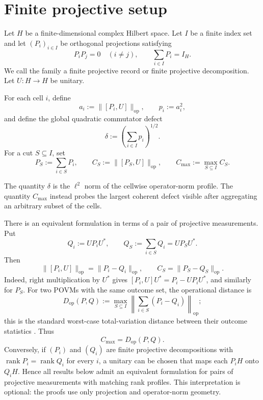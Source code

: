 \documentclass[11pt]{article}
\newcommand{\op}{\mathrm{op}}
\newcommand{\cmax}{C_{\max}}
\newcommand{\dd}{\delta}
\begin{document}
\section{Finite projective setup}

Let $H$ be a finite-dimensional complex Hilbert space.  Let
$I$ be a finite index set and let $(P_i)_{i\in I}$ be orthogonal projections
satisfying
\begin{equation}\label{eq:decomp}
  P_iP_j=0\quad(i\neq j),
  \qquad
  \sum_{i\in I}P_i=I_H.
\end{equation}
We call the family a finite projective record or finite projective
decomposition.  Let $U:H\to H$ be unitary.

For each cell $i$, define
\begin{equation}\label{eq:ai}
  a_i:=\|[P_i,U]\|_{\op},
  \qquad
  p_i:=a_i^2,
\end{equation}
and define the global quadratic commutator defect
\begin{equation}\label{eq:delta}
  \dd:=\left(\sum_{i\in I}p_i\right)^{1/2}.
\end{equation}
For a cut $S\subseteq I$, set
\begin{equation}\label{eq:cut}
  P_S:=\sum_{i\in S}P_i,
  \qquad
  C_S:=\|[P_S,U]\|_{\op},
  \qquad
  \cmax:=\max_{S\subseteq I}C_S.
\end{equation}

The quantity $\dd$ is the $\ell^2$ norm of the cellwise operator-norm profile.
The quantity $\cmax$ instead probes the largest coherent defect visible after
aggregating an arbitrary subset of the cells.

There is an equivalent formulation in terms of a pair of projective
measurements.  Put
\[
  Q_i:=UP_iU^*,
  \qquad
  Q_S:=\sum_{i\in S}Q_i=UP_SU^*.
\]
Then
\begin{equation}\label{eq:pvm-distance-identities}
  \|[P_i,U]\|_{\op}=\|P_i-Q_i\|_{\op},
  \qquad
  C_S=\|P_S-Q_S\|_{\op}.
\end{equation}
Indeed, right multiplication by $U^*$ gives
$[P_i,U]U^*=P_i-UP_iU^*$, and similarly for $P_S$.
For two POVMs with the same outcome set, the operational distance is
\[
  D_{\mathrm{op}}(P,Q)
  :=
  \max_{S\subseteq I}
  \left\|\sum_{i\in S}(P_i-Q_i)\right\|_{\op};
\]
this is the standard worst-case total-variation distance between their outcome
statistics \cite{NavascuesPopescu2014,MaciejewskiZimborasOszmaniec2020}.
Thus
\begin{equation}\label{eq:cmax-operational}
  \cmax=D_{\mathrm{op}}(P,Q).
\end{equation}
Conversely, if $(P_i)$ and $(Q_i)$ are finite projective decompositions with
$\operatorname{rank}P_i=\operatorname{rank}Q_i$ for every $i$, a unitary can
be chosen that maps each $P_iH$ onto $Q_iH$.  Hence all results below admit an
equivalent formulation for pairs of projective measurements with matching
rank profiles.  This interpretation is optional: the proofs use only
projection and operator-norm geometry.
\end{document}
